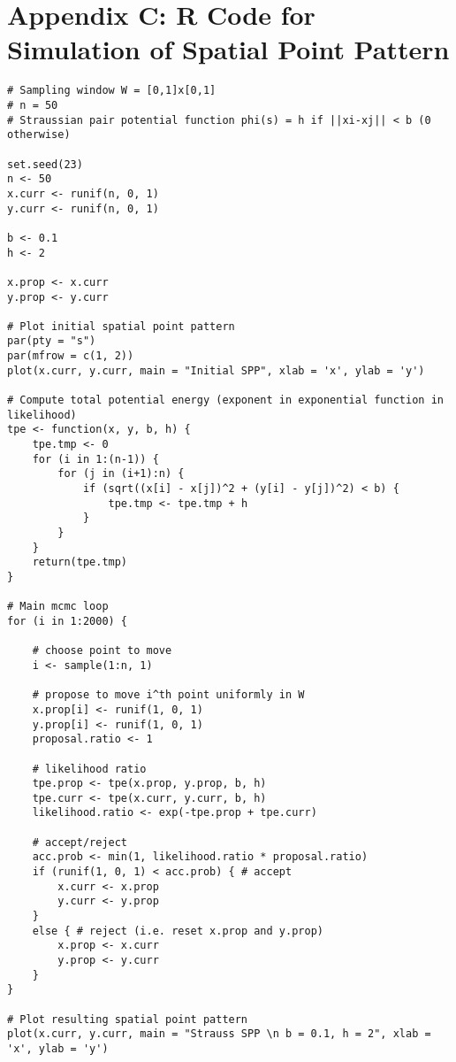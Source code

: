 \documentclass[12pt,openany]{article}
\theoremstyle{remark} %
\theoremstyle{definition} %
\begin{document}
\section{Appendix C: \textsf{R} Code for Simulation of Spatial Point Pattern}
\begin{verbatim}
# Sampling window W = [0,1]x[0,1]
# n = 50
# Straussian pair potential function phi(s) = h if ||xi-xj|| < b (0 otherwise)

set.seed(23)
n <- 50
x.curr <- runif(n, 0, 1)
y.curr <- runif(n, 0, 1)

b <- 0.1	
h <- 2		

x.prop <- x.curr
y.prop <- y.curr

# Plot initial spatial point pattern
par(pty = "s")
par(mfrow = c(1, 2))
plot(x.curr, y.curr, main = "Initial SPP", xlab = 'x', ylab = 'y')

# Compute total potential energy (exponent in exponential function in likelihood)
tpe <- function(x, y, b, h) {
    tpe.tmp <- 0
    for (i in 1:(n-1)) {
        for (j in (i+1):n) {
            if (sqrt((x[i] - x[j])^2 + (y[i] - y[j])^2) < b) {
                tpe.tmp <- tpe.tmp + h
            }
        }
    }
    return(tpe.tmp)
}

# Main mcmc loop
for (i in 1:2000) {

    # choose point to move
    i <- sample(1:n, 1)
	
    # propose to move i^th point uniformly in W 
    x.prop[i] <- runif(1, 0, 1)
    y.prop[i] <- runif(1, 0, 1)
    proposal.ratio <- 1
	
    # likelihood ratio
    tpe.prop <- tpe(x.prop, y.prop, b, h)
    tpe.curr <- tpe(x.curr, y.curr, b, h)
    likelihood.ratio <- exp(-tpe.prop + tpe.curr) 	
	
    # accept/reject
    acc.prob <- min(1, likelihood.ratio * proposal.ratio)
    if (runif(1, 0, 1) < acc.prob) { # accept
        x.curr <- x.prop
        y.curr <- y.prop
    }
    else { # reject (i.e. reset x.prop and y.prop)
        x.prop <- x.curr
        y.prop <- y.curr
    }
}

# Plot resulting spatial point pattern
plot(x.curr, y.curr, main = "Strauss SPP \n b = 0.1, h = 2", xlab = 'x', ylab = 'y')

\end{verbatim}

\newpage


\end{document}
